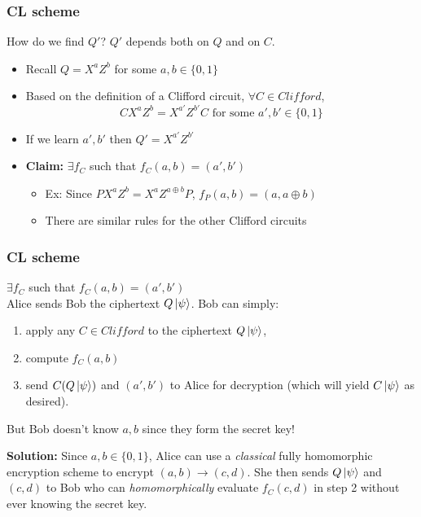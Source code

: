 \begin{frame}
\frametitle{CL scheme}
How do we find $Q'$? \pause
\vspace*{5mm}
$Q'$ depends both on $Q$ and on $C$.
\begin{itemize}
  \item Recall $Q = X^aZ^b$ for some $a,b \in \{0,1\}$ \pause
  \item Based on the definition of a Clifford circuit, $\forall C \in Clifford$, \[ CX^aZ^b = X^{a'}Z^{b'}C \text{ for some } a',b' \in \{0,1\} \] \pause
  \item If we learn $a',b'$ then $Q' = X^{a'}Z^{b'}$ \pause
  \item \textbf{Claim:} $\exists f_C$ such that $f_C(a, b) = (a', b')$ \pause
  \begin{itemize}
     \item Ex: Since $PX^aZ^b = X^aZ^{a \oplus b}P$, \hspace*{5mm} $f_P(a,b) = (a, a \oplus b)$ \pause  
     \item There are similar rules for the other Clifford circuits
  \end{itemize}  
\end{itemize}
\end{frame}
 
\begin{frame}
\frametitle{CL scheme}
$\exists f_C$ such that $f_C(a, b) = (a', b')$ \\ \pause
Alice sends Bob the ciphertext $Q\left\vert{\psi}\right\rangle$. Bob can simply:
\begin{enumerate}
  \item apply any $C \in Clifford$ to the ciphertext $Q\left\vert{\psi}\right\rangle$, 
  \item compute $f_C(a,b)$
  \item send $C(Q\left\vert{\psi}\right\rangle)$ and $(a',b')$ to Alice for decryption (which will yield $C\left\vert{\psi}\right\rangle$ as desired). 
\end{enumerate} \pause
But Bob doesn't know $a,b$ since they form the secret key! \pause
\vspace*{5mm}

\textbf{Solution:} Since $a,b \in \{0,1\}$, Alice can use a \textit{classical} fully homomorphic encryption scheme to encrypt $(a,b) \rightarrow (c,d)$. She then sends $Q\left\vert{\psi}\right\rangle$ and $(c,d)$ to Bob who can \textit{homomorphically} evaluate $f_C(c,d)$ in step 2 without ever knowing the secret key. 
\end{frame}
 
